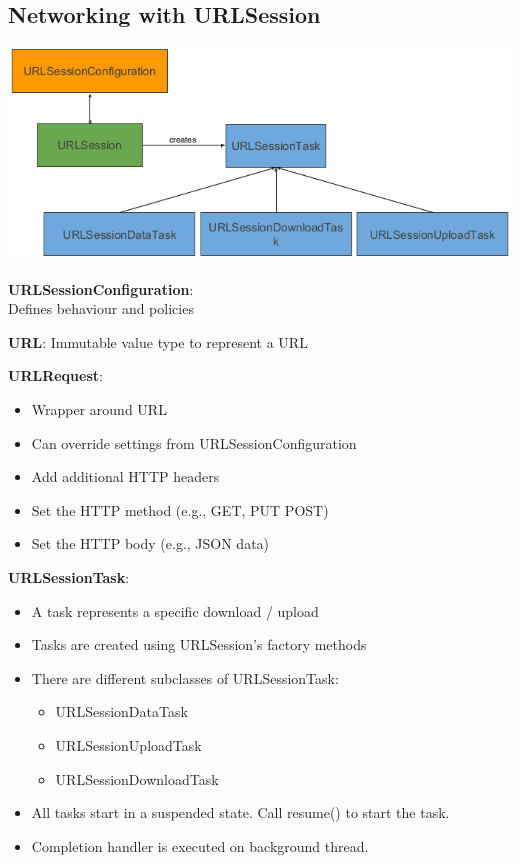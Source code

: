 \subsection{Networking with URLSession}

\begin{breakbox}

\includegraphics[width=.15\textwidth]{figures/urlSession.png}

\textbf{URLSessionConfiguration}: \\
Defines behaviour and policies

\textbf{URL}: Immutable value type to represent a URL

\textbf{URLRequest}:

\begin{itemize}
\tightlist
\item
  Wrapper around URL
\item
  Can override settings from URLSessionConfiguration
\item
  Add additional HTTP headers
\item
  Set the HTTP method (e.g., GET, PUT POST)
\item
  Set the HTTP body (e.g., JSON data)
\end{itemize}

\textbf{URLSessionTask}:

\begin{itemize}
\tightlist
\item
  A task represents a specific download / upload
\item
  Tasks are created using URLSession's factory methods
\item
  There are different subclasses of URLSessionTask:

  \begin{itemize}
  \tightlist
  \item
    URLSessionDataTask
  \item
    URLSessionUploadTask
  \item
    URLSessionDownloadTask
  \end{itemize}
\item
  All tasks start in a suspended state. Call resume() to start the task.
\item
  Completion handler is executed on background thread.
\end{itemize}
\end{breakbox}

